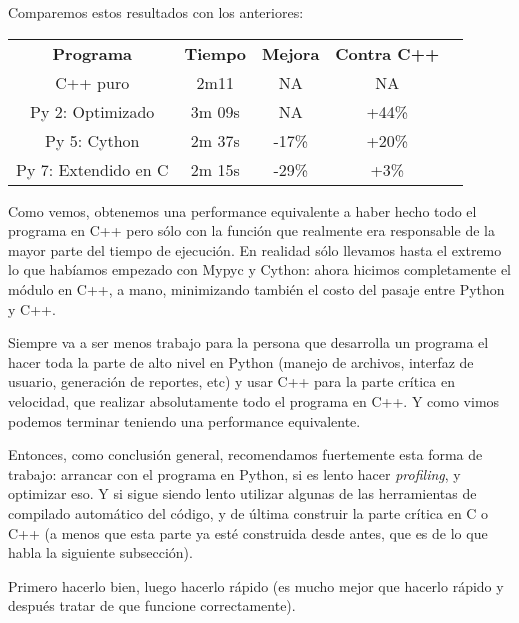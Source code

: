 
Comparemos estos resultados con los anteriores:

\begin{center}
 \begin{tabular} {ccccc}
 \toprule
  \textbf{Programa} & \textbf{Tiempo} & \textbf{Mejora} & \textbf{Contra C++} \\
  C++ puro & 2m11 & NA & NA \\
  Py 2: Optimizado & 3m 09s & NA & +44\% \\
  Py 5: Cython & 2m 37s & -17\% & +20\% \\
  Py 7: Extendido en C & 2m 15s & -29\% & +3\% \\
  \bottomrule
 \end{tabular}
\end{center}

Como vemos, obtenemos una performance equivalente a haber hecho todo el programa en C++ pero sólo con la función que realmente era responsable de la mayor parte del tiempo de ejecución. En realidad sólo llevamos hasta el extremo lo que habíamos empezado con Mypyc y Cython: ahora hicimos completamente el módulo en C++, a mano, minimizando también el costo del pasaje entre Python y C++.

Siempre va a ser menos trabajo para la persona que desarrolla un programa el hacer toda la parte de alto nivel en Python (manejo de archivos, interfaz de usuario, generación de reportes, etc) y usar C++ para la parte crítica en velocidad, que realizar absolutamente todo el programa en C++. Y como vimos podemos terminar teniendo una performance equivalente.

Entonces, como conclusión general, recomendamos fuertemente esta forma de trabajo: arrancar con el programa en Python, si es lento hacer \textit{profiling}, y optimizar eso. Y si sigue siendo lento utilizar algunas de las herramientas de compilado automático del código, y de última construir la parte crítica en C o C++ (a menos que esta parte ya esté construida desde antes, que es de lo que habla la siguiente subsección).

Primero hacerlo bien, luego hacerlo rápido (es mucho mejor que hacerlo rápido y después tratar de que funcione correctamente).


